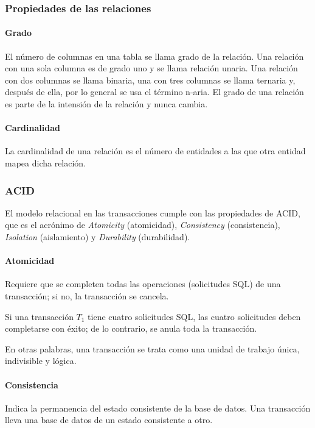 \subsubsection{Propiedades de las relaciones}
\paragraph*{Grado}
El número de columnas en una tabla se llama grado de la relación. Una relación con una sola columna es de grado uno y se llama relación unaria. Una relación con dos columnas se llama binaria, una con tres columnas se llama ternaria y, después de ella, por lo general se usa el término n-aria. El grado de una relación es parte de la intensión de la relación y nunca cambia.


\paragraph*{Cardinalidad}
La cardinalidad de una relación es el número de entidades a las que otra entidad mapea dicha relación.

\subsubsection{ACID}
El modelo relacional en las transacciones cumple con las propiedades de ACID, que es el acrónimo de \textit{Atomicity} (atomicidad), \textit{Consistency} (consistencia), \textit{Isolation} (aislamiento) y \textit{Durability} (durabilidad). 

\paragraph*{Atomicidad}
Requiere que se completen todas las operaciones (solicitudes SQL) de una transacción;
si no, la transacción se cancela. 


Si una transacción $T_{1}$ tiene cuatro solicitudes SQL, las cuatro solicitudes deben completarse con éxito; de lo contrario, se anula toda la transacción.


En otras palabras, una transacción se trata como una unidad de trabajo única, indivisible y lógica.
\paragraph*{Consistencia}
Indica la permanencia del estado consistente de la base de datos. Una transacción lleva una base de datos de un estado consistente a otro. 


